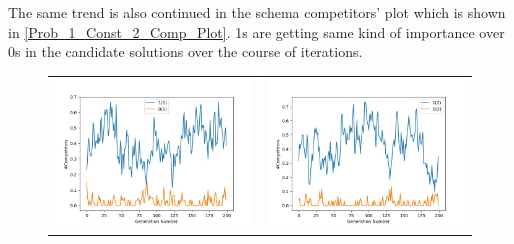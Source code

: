\documentclass{article}
\begin{document}
	The same trend is also continued in the schema competitors' plot which is shown in \autoref{Prob_1_Const_2_Comp_Plot}. 1s are getting same kind of importance over 0s in the candidate solutions over the course of iterations.
	\begin{figure}[H]
		\centering
		\begin{adjustbox}{width=0.6\paperwidth}
			\begin{tabular}{c c}
				\includegraphics{Codes/Problem_1 Construction_2/Comp_1.jpg} & \includegraphics{Codes/Problem_1 Construction_2/Comp_2.jpg} \\

\end{tabular}
\end{adjustbox}
\end{figure}
\end{document}
